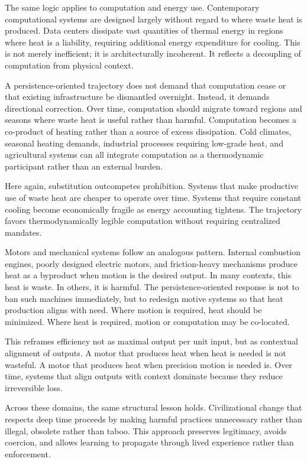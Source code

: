 \documentclass[12pt,oneside]{book}
\begin{document}
The same logic applies to computation and energy use. Contemporary computational systems are designed largely without regard to where waste heat is produced. Data centers dissipate vast quantities of thermal energy in regions where heat is a liability, requiring additional energy expenditure for cooling. This is not merely inefficient; it is architecturally incoherent. It reflects a decoupling of computation from physical context.

A persistence-oriented trajectory does not demand that computation cease or that existing infrastructure be dismantled overnight. Instead, it demands directional correction. Over time, computation should migrate toward regions and seasons where waste heat is useful rather than harmful. Computation becomes a co-product of heating rather than a source of excess dissipation. Cold climates, seasonal heating demands, industrial processes requiring low-grade heat, and agricultural systems can all integrate computation as a thermodynamic participant rather than an external burden.

Here again, substitution outcompetes prohibition. Systems that make productive use of waste heat are cheaper to operate over time. Systems that require constant cooling become economically fragile as energy accounting tightens. The trajectory favors thermodynamically legible computation without requiring centralized mandates.

Motors and mechanical systems follow an analogous pattern. Internal combustion engines, poorly designed electric motors, and friction-heavy mechanisms produce heat as a byproduct when motion is the desired output. In many contexts, this heat is waste. In others, it is harmful. The persistence-oriented response is not to ban such machines immediately, but to redesign motive systems so that heat production aligns with need. Where motion is required, heat should be minimized. Where heat is required, motion or computation may be co-located.

This reframes efficiency not as maximal output per unit input, but as contextual alignment of outputs. A motor that produces heat when heat is needed is not wasteful. A motor that produces heat when precision motion is needed is. Over time, systems that align outputs with context dominate because they reduce irreversible loss.

Across these domains, the same structural lesson holds. Civilizational change that respects deep time proceeds by making harmful practices unnecessary rather than illegal, obsolete rather than taboo. This approach preserves legitimacy, avoids coercion, and allows learning to propagate through lived experience rather than enforcement.
\end{document}
